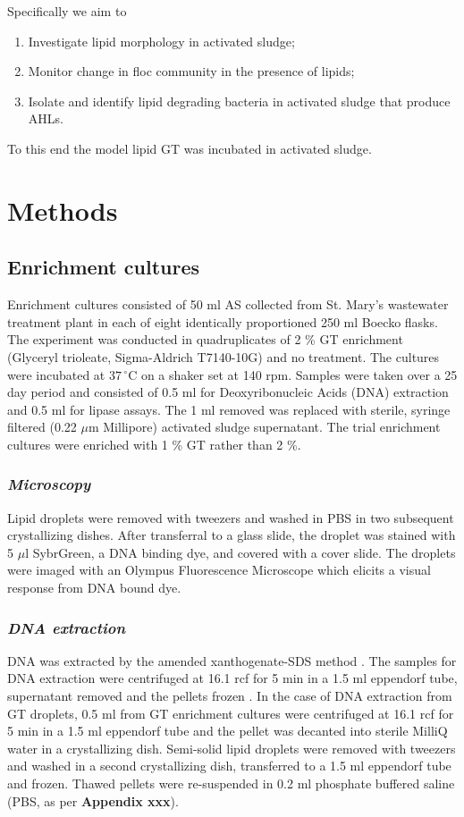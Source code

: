 \documentclass{article}
\begin{document}
\noindent
Specifically we aim to

\begin{enumerate}
\item Investigate lipid morphology in activated sludge;
\item Monitor change in floc community in the presence of lipids;
\item Isolate and identify lipid degrading bacteria in activated sludge that produce AHLs.
\end{enumerate}
To this end the model lipid GT was incubated in activated sludge.
\newpage
\section{Methods}

\subsection{Enrichment cultures}
Enrichment cultures consisted of 50 ml AS collected from St. Mary's wastewater treatment plant in each of eight identically proportioned 250 ml Boecko flasks. The experiment was conducted in quadruplicates of 2 \% GT enrichment (Glyceryl trioleate, Sigma-Aldrich T7140-10G) and no treatment. The cultures were incubated at $37\,^{\circ}\mathrm{C}$ on a shaker set at 140 rpm. Samples were taken over a 25 day period and consisted of 0.5 ml for Deoxyribonucleic Acids (DNA) extraction and 0.5 ml for lipase assays. The 1 ml removed was replaced with sterile, syringe filtered (0.22 $\mu$m Millipore) activated sludge supernatant. The trial enrichment cultures were enriched with 1 \% GT rather than 2 \%.

\subsubsection{\emph{Microscopy}}
Lipid droplets were removed with tweezers and washed in PBS in two subsequent crystallizing dishes. After transferral to a glass slide, the droplet was stained with 5 $\mu$l SybrGreen, a DNA binding dye, and covered with a cover slide. The droplets were imaged with an Olympus Fluorescence Microscope which elicits a visual response from DNA bound dye.

\subsubsection{\emph{DNA extraction}}
DNA was extracted by the amended xanthogenate-SDS method \cite{tillett2000xanthogenate}. The samples for DNA extraction were centrifuged at 16.1 rcf for 5 min in a 1.5 ml eppendorf tube, supernatant removed and the pellets frozen . In the case of DNA extraction from GT droplets, 0.5 ml from GT enrichment cultures were centrifuged at 16.1 rcf for 5 min in a 1.5 ml eppendorf tube and the pellet was decanted into sterile MilliQ water in a crystallizing dish. Semi-solid lipid droplets were removed with tweezers and washed in a second crystallizing dish, transferred to a 1.5 ml eppendorf tube and frozen. Thawed pellets were re-suspended in 0.2 ml phosphate buffered saline (PBS, as per \textbf{Appendix xxx}).
\end{document}
